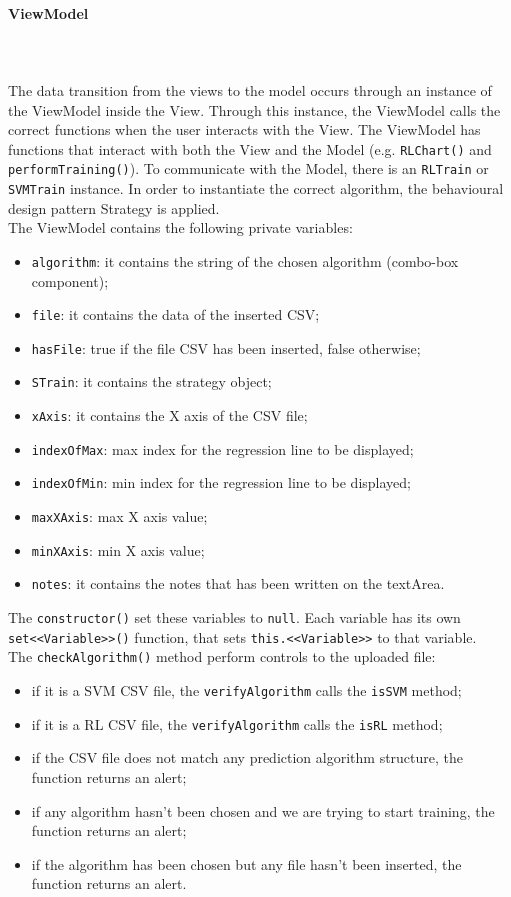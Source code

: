 \paragraph{ViewModel}\mbox{} \\ \mbox{} \\
The data transition from the views to the model occurs through an instance of the ViewModel inside the View. Through this instance, the ViewModel calls the correct functions when the user interacts with the View.
The ViewModel has functions that interact with both the View and the Model (e.g. \texttt{RLChart()} and \texttt{performTraining()}).
To communicate with the Model, there is an \texttt{RLTrain} or \texttt{SVMTrain} instance. In order to instantiate the correct algorithm, the behavioural design pattern Strategy is applied. \\
The ViewModel contains the following private variables: \begin{itemize}
\item \texttt{algorithm}: it contains the string of the chosen algorithm (combo-box component);
\item \texttt{file}: it contains the data of the inserted CSV;
\item \texttt{hasFile}: true if the file CSV has been inserted, false otherwise;
\item \texttt{STrain}: it contains the strategy object;
\item \texttt{xAxis}: it contains the X axis of the CSV file;
\item \texttt{indexOfMax}: max index for the regression line to be displayed;
\item \texttt{indexOfMin}: min index for the regression line to be displayed;
\item \texttt{maxXAxis}: max X axis value;
\item \texttt{minXAxis}: min X axis value;
\item \texttt{notes}: it contains the notes that has been written on the textArea.
\end{itemize}
The \texttt{constructor()} set these variables to \texttt{null}.
Each variable has its own \texttt{set<<Variable>>()} function, that sets \texttt{this.<<Variable>>} to that variable. \\
The \texttt{checkAlgorithm()} method perform controls to the uploaded file: \begin{itemize}
\item if it is a SVM CSV file, the \texttt{verifyAlgorithm} calls the \texttt{isSVM} method;
\item if it is a RL CSV file, the \texttt{verifyAlgorithm} calls the \texttt{isRL} method;
\item if the CSV file does not match any prediction algorithm structure, the function returns an alert;
\item if any algorithm hasn't been chosen and we are trying to start training, the function returns an alert;
\item if the algorithm has been chosen but any file hasn't been inserted, the function returns an alert.
\end{itemize}
